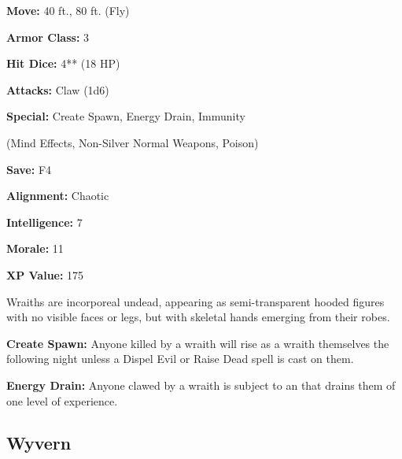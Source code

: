 \begin{multicols*}{2}
{\textbf{Move:} 40 ft., 80 ft. (Fly)

\textbf{Armor Class:} 3

\textbf{Hit Dice:} 4** (18 HP)

\textbf{Attacks:} Claw (1d6)

\textbf{Special:} Create Spawn, Energy Drain, Immunity 

(Mind Effects, Non-Silver Normal Weapons, Poison)

\textbf{Save:} F4

\textbf{Alignment:} Chaotic

\textbf{Intelligence:} 7

\textbf{Morale:} 11

\textbf{XP Value:} 175}

Wraiths are incorporeal undead, appearing as semi-transparent hooded figures with no visible faces or legs, but with skeletal hands emerging from their robes.

\textbf{Create Spawn:} Anyone killed by a wraith will rise as a wraith themselves the following night unless a Dispel Evil or Raise Dead spell is cast on them.

\textbf{Energy Drain:} Anyone clawed by a wraith is subject to an  that drains them of one level of experience.

\subsection{Wyvern}


\end{multicols*}
